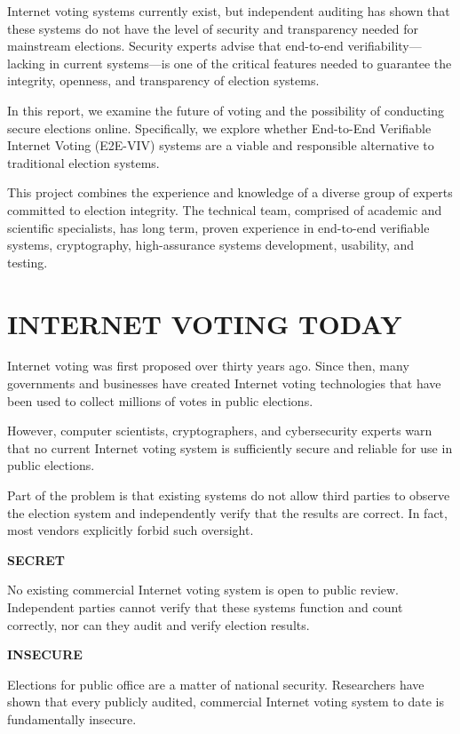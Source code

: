 Internet voting systems currently exist, but independent auditing has
shown that these systems do not have the level of security and
transparency needed for mainstream elections. Security experts advise
that end-to-end verifiability---lacking in current systems---is one of
the critical features needed to guarantee the integrity, openness, and
transparency of election systems.

In this report, we examine the future of voting and the possibility of
conducting secure elections online. Specifically, we explore whether
End-to-End Verifiable Internet Voting (E2E-VIV) systems are a viable
and responsible alternative to traditional election systems.

This project combines the experience and knowledge of a diverse group
of experts committed to election integrity. The technical team,
comprised of academic and scientific specialists, has long term,
proven experience in end-to-end verifiable systems, cryptography,
high-assurance systems development, usability, and testing.

\section*{INTERNET VOTING TODAY}

Internet voting was first proposed over thirty years ago. Since then,
many governments and businesses have created Internet voting
technologies that have been used to collect millions of votes in
public elections.

However, computer scientists, cryptographers, and cybersecurity
experts warn that no current Internet voting system is sufficiently
secure and reliable for use in public elections.

Part of the problem is that existing systems do not allow third
parties to observe the election system and independently verify that
the results are correct.  In fact, most vendors explicitly forbid
such oversight.

\noindent \textbf{SECRET}

No existing commercial Internet voting system is open to public
review. Independent parties cannot verify that these systems function
and count correctly, nor can they audit and verify election results.

\textbf{INSECURE}

Elections for public office are a matter of national
security. Researchers have shown that every publicly audited,
commercial Internet voting system to date is fundamentally insecure.

